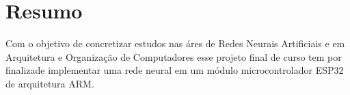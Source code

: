 \section{Resumo}

Com o objetivo de concretizar estudos nas áres de Redes Neurais Artificiais e
em Arquitetura e Organização de Computadores esse projeto final de curso tem por finalizade
implementar uma rede neural em um módulo microcontrolador ESP32 de arquitetura ARM.

